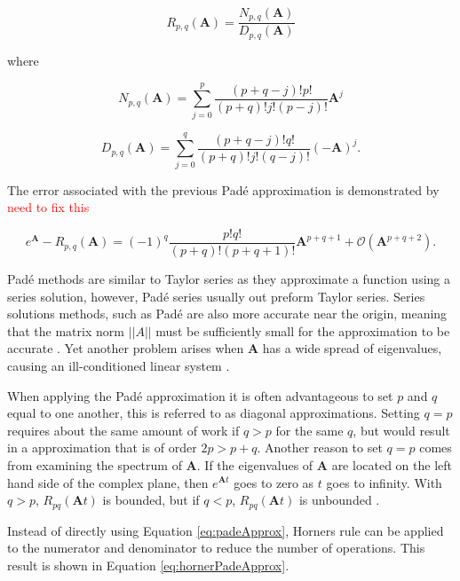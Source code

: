\begin{equation}
    R_{p,q}(\boldsymbol{A}) = \frac{N_{p,q}(\boldsymbol{A})}{D_{p,q}(\boldsymbol{A})}
    \label{eq:padeApprox}
\end{equation}

\noindent where

\begin{equation*}
    N_{p,q}(\boldsymbol{A}) = \sum_{j=0}^{p}\frac{(p + q - j)!p!}{(p + q)!j!(p - j)!}\boldsymbol{A}^{j}
\end{equation*}

\begin{equation*}
    D_{p,q}(\boldsymbol{A}) = \sum_{j=0}^{q}\frac{(p + q - j)!q!}{(p + q)!j!(q - j)!}(-\boldsymbol{A})^{j}.
\end{equation*}

\noindent The error associated with the previous Pad\'e approximation is demonstrated by \cite{higham2005} \textcolor{red}{need to fix this}

\begin{equation}
    e^{\boldsymbol{A}} - R_{p,q}(\boldsymbol{A}) = (-1)^{q}\frac{p!q!}{(p+q)!(p+q+1)!}\boldsymbol{A}^{p+q+1} + \mathcal{O}(\boldsymbol{A}^{p+q+2}).
\end{equation}

Pad\'e methods are similar to Taylor series as they approximate a function using a series solution, however, Pad\'e series usually out preform Taylor series. Series solutions methods, such as Pad\'e are also more accurate near the origin, meaning that the matrix norm $||A||$ must be sufficiently small for the approximation to be accurate \cite{pusa2010}. Yet another problem arises when $\boldsymbol{A}$ has a wide spread of eigenvalues, causing an ill-conditioned linear system  \cite{exokit} \cite{moler2003}.  

When applying the Pad\'e approximation it is often advantageous to set $p$ and $q$ equal to one another, this is referred to as diagonal approximations. Setting $q = p$ requires about the same amount of work if $q > p$ for the same $q$, but would result in a approximation that is of order $2p > p + q$. Another reason to set $q=p$ comes from examining the spectrum of $\boldsymbol{A}$. If the eigenvalues of $\boldsymbol{A}$ are located on the left hand side of the complex plane, then $e^{\boldsymbol{A}t}$ goes to zero as $t$ goes to infinity. With $q > p$, $R_{pq}(\boldsymbol{A}t)$ is bounded, but if $q < p$, $R_{pq}(\boldsymbol{A}t)$ is unbounded \cite{moler2003}. 


Instead of directly using Equation \ref{eq:padeApprox}, Horners rule can be applied to the numerator and denominator to reduce the number of operations. This result is shown in Equation \ref{eq:hornerPadeApprox}. 

